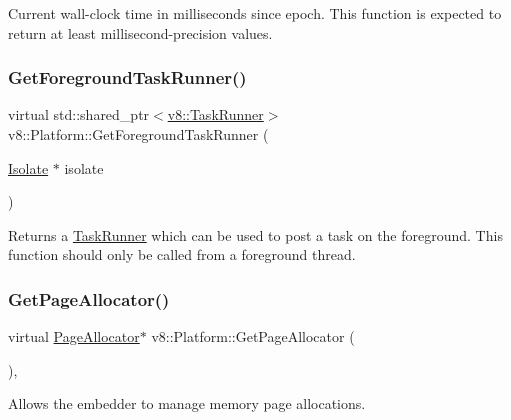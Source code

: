 Current wall-\/clock time in milliseconds since epoch. This function is expected to return at least millisecond-\/precision values. \mbox{\label{classv8_1_1Platform_af0d18c6bbefa133c5d11ec8a460d0278}} 
\subsubsection{\texorpdfstring{Get\+Foreground\+Task\+Runner()}{GetForegroundTaskRunner()}}
{\footnotesize\ttfamily virtual std\+::shared\+\_\+ptr$<$\mbox{\hyperlink{classv8_1_1TaskRunner}{v8\+::\+Task\+Runner}}$>$ v8\+::\+Platform\+::\+Get\+Foreground\+Task\+Runner (\begin{DoxyParamCaption}\item[{\mbox{\hyperlink{classv8_1_1Isolate}{Isolate}} $\ast$}]{isolate }\end{DoxyParamCaption})\hspace{0.3cm}{\ttfamily [pure virtual]}}

Returns a \mbox{\hyperlink{classv8_1_1TaskRunner}{Task\+Runner}} which can be used to post a task on the foreground. This function should only be called from a foreground thread. \mbox{\label{classv8_1_1Platform_ab7c1886dd8131f7389b805bc98276702}} 
\subsubsection{\texorpdfstring{Get\+Page\+Allocator()}{GetPageAllocator()}}
{\footnotesize\ttfamily virtual \mbox{\hyperlink{classv8_1_1PageAllocator}{Page\+Allocator}}$\ast$ v8\+::\+Platform\+::\+Get\+Page\+Allocator (\begin{DoxyParamCaption}{ }\end{DoxyParamCaption})\hspace{0.3cm}{\ttfamily [inline]}, {\ttfamily [virtual]}}

Allows the embedder to manage memory page allocations. \mbox{\label{classv8_1_1Platform_aadb2594e6ff9a6f6a0657412ff5a7206}} 
